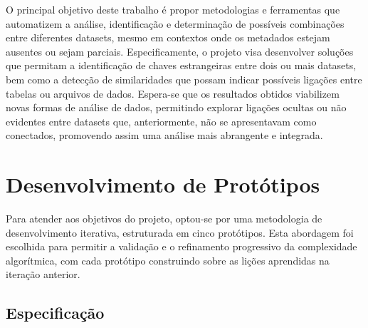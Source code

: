 \documentclass[12pt, a4paper]{article}
\begin{document}
O principal objetivo deste trabalho é propor metodologias e ferramentas que automatizem a análise, identificação e determinação de possíveis combinações entre diferentes datasets, mesmo em contextos onde os metadados estejam ausentes ou sejam parciais. 
Especificamente, o projeto visa desenvolver soluções que permitam a identificação de chaves estrangeiras entre dois ou mais datasets, bem como a detecção de similaridades que possam indicar possíveis ligações entre tabelas ou arquivos de dados. 
Espera-se que os resultados obtidos viabilizem novas formas de análise de dados, permitindo explorar ligações ocultas ou não evidentes entre datasets que, anteriormente, não se apresentavam como conectados, promovendo assim uma análise mais abrangente e integrada. 

\newpage
\section{Desenvolvimento de Protótipos} 
\label{sec:desenvolvimento-prototipos}

Para atender aos objetivos do projeto, optou-se por uma metodologia de desenvolvimento iterativa, estruturada em cinco protótipos. 
Esta abordagem foi escolhida para permitir a validação e o refinamento progressivo da complexidade algorítmica, com cada protótipo construindo sobre as lições aprendidas na iteração anterior. 

\subsection{Especificação}
\label{subsec:especificacao}
\end{document}
